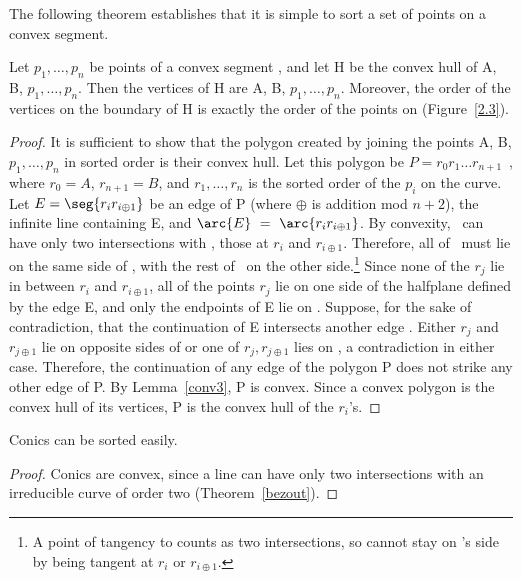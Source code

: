 The following theorem establishes that it 
is simple to sort a set of points on a convex segment.

\begin{theorem}
\label{thm-2.1}
Let $p_{1},\ldots,p_{n}$ be points of a convex segment , 
and let H be the convex hull of A, B, $p_{1},\ldots,p_{n}$.
Then the vertices of H are A, B, $p_{1},\ldots,p_{n}$.
Moreover, the order of the vertices on the boundary of H is exactly
the order of the points on  (Figure~\ref{2.3}).
\end{theorem}

%
\begin{proof}
It is sufficient to
show that the polygon created by joining the points A, B, 
$p_{1},\ldots,p_{n}$ in sorted
order is their convex hull.  Let this polygon 
be $P = r_{0}r_{1}\ldots r_{n+1}$\ , where $r_{0} = A$, $r_{n+1} = B$, and
$r_{1},\ldots ,r_{n}$ is the sorted order of the $p_{i}$ on the curve.
Let $E = \seg{r_{i}r_{i\oplus 1}}$ be an edge of P (where 
$\oplus$ is addition mod $n+2$),  the infinite
line containing E, and $\arc{E}~=~\arc{r_{i}r_{i\oplus 1}}$.
By convexity, \ can have only two
intersections with , those at $r_{i}$ and $r_{i\oplus 1}$.
Therefore, all of \ must lie on the same side of ,
with the rest of \ on the other side.\footnote{A point
of tangency to  counts as two intersections, so  cannot
stay on 's side by being tangent at $r_{i}$
or $r_{i\oplus 1}$.}
Since none of the $r_{j}$ lie in between $r_{i}$ and $r_{i\oplus 1}$,
all of the points $r_{j}$ lie on one side of the halfplane defined
by the edge E, and only the endpoints of E lie on .
Suppose, for the sake of contradiction,
that the continuation  of E intersects another edge
.
Either $r_{j}$ and $r_{j\oplus 1}$ lie on opposite sides of 
or one of $r_{j},r_{j\oplus 1}$ lies on ,
a contradiction in either case.
Therefore, the continuation of any edge of the polygon P does not strike any other
edge of P.
By Lemma~\ref{conv3}, P is convex.
Since a convex polygon is the convex hull of its vertices,
P is the convex hull of the $r_{i}$'s.
\end{proof}

\begin{corollary}
\label{easyconic}
Conics can be sorted easily.
\end{corollary}
\begin{proof}
Conics are convex, since 
a line can have only two intersections with an irreducible curve of order 
two (Theorem~\ref{bezout}).
\end{proof}

